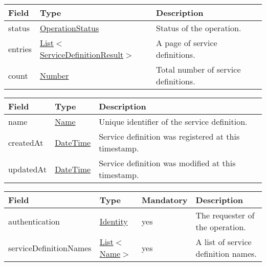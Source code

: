 \documentclass[a4paper]{arrowhead}
\newcommand{\pref}[1]{{\textcolor{ArrowheadGrey}{\hyperref[sec:model:primitives:#1]{#1}}}}
\begin{document}

\begin{table}[ht!]
\begin{tabularx}{\textwidth}{| p{2.5cm} | p{5cm} | X |} \hline
\rowcolor{gray!33} Field & Type      & Description \\ \hline
status & \pref{OperationStatus} & Status of the operation. \\ \hline
entries & \pref{List}$<$\hyperref[sec:model:ServiceDefinitionResult]{ServiceDefinitionResult}$>$ & A page of service definitions. \\ \hline
count & \pref{Number} & Total number of service definitions. \\ \hline
\end{tabularx}
\end{table}

 
\begin{table}[ht!]
\begin{tabularx}{\textwidth}{| p{2.5cm} | p{2.5cm} | X |} \hline
\rowcolor{gray!33} Field & Type      & Description \\ \hline
name & \pref{Name} & Unique identifier of the service definition. \\ \hline
createdAt & \pref{DateTime} & Service definition was registered at this timestamp. \\ \hline
updatedAt & \pref{DateTime} & Service definition was modified at this timestamp. \\ \hline
\end{tabularx}
\end{table}

 
\begin{table}[ht!]
\begin{tabularx}{\textwidth}{| p{3.7cm} | p{2.5cm} | p{2cm} | X |} \hline
\rowcolor{gray!33} Field & Type & Mandatory & Description \\ \hline
authentication & \hyperref[sec:model:Identity]{Identity} & yes & The requester of the operation. \\ \hline
serviceDefinitionNames & \pref{List}$<$\pref{Name}$>$ & yes & A list of service definition names. \\ \hline
\end{tabularx}
\end{table}
\end{document}
